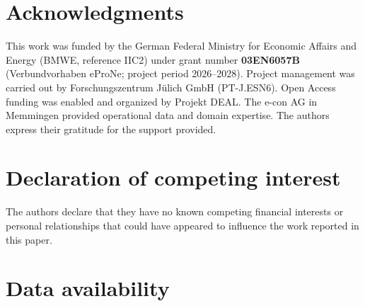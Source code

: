 
\section*{Acknowledgments}

This work was funded by the German Federal Ministry for Economic Affairs and Energy
(BMWE, reference IIC2) under grant number \textbf{03EN6057B} (Verbundvorhaben eProNe;
project period 2026--2028). Project management was carried out by Forschungszentrum
J\"ulich GmbH (PT-J.ESN6). Open Access funding was enabled and organized by Projekt DEAL.
The e-con AG in Memmingen provided operational data and domain expertise. The authors
express their gratitude for the support provided.

\section*{Declaration of competing interest}


The authors declare that they have no known competing financial interests or personal
relationships that could have appeared to influence the work reported in this paper.

\section*{Data availability}

